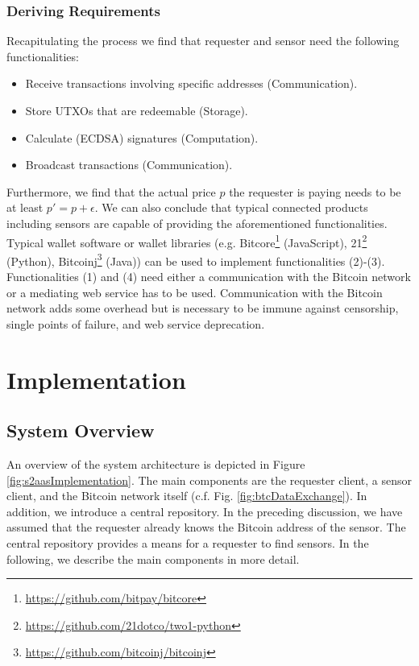 \subsubsection{Deriving Requirements}
\label{sec:s2aas_requirements}

Recapitulating the process we find that requester and sensor need the following functionalities:
\begin{itemize}
\item Receive transactions involving specific addresses (Communication).
\item Store \ac{UTXO}s that are redeemable (Storage).
\item Calculate (\ac{ECDSA}) signatures (Computation).
\item Broadcast transactions (Communication).
\end{itemize}
Furthermore, we find that the actual price $p$ the requester is paying needs to be at least $p'=p+\epsilon$.  
We can also conclude that typical connected products including sensors are capable of providing the aforementioned functionalities. Typical wallet software or wallet libraries (e.g. Bitcore\footnote{\url{https://github.com/bitpay/bitcore}} (JavaScript), 21\footnote{\url{https://github.com/21dotco/two1-python}} (Python), Bitcoinj\footnote{\url{https://github.com/bitcoinj/bitcoinj}} (Java)) can be used to implement functionalities (2)-(3). Functionalities (1) and (4) need either a communication with the Bitcoin network or a mediating web service has to be used. Communication with the Bitcoin network adds some overhead but is necessary to be immune against censorship, single points of failure, and web service deprecation.

\section{Implementation}
\label{sec:s2aas_implementation}

\subsection{System Overview}

An overview of the system architecture is depicted in Figure \ref{fig:s2aasImplementation}. The main components are the requester client, a sensor client, and the Bitcoin network itself (c.f. Fig. \ref{fig:btcDataExchange}). In addition, we introduce a central repository. In the preceding discussion, we have assumed that the requester already knows the Bitcoin address of the sensor. The central repository provides a means for a requester to find sensors. In the following, we describe the main components in more detail. 


